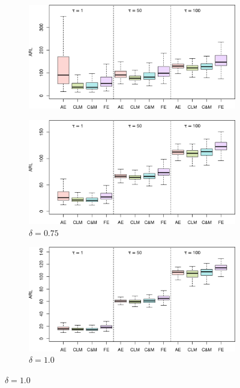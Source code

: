 \begin{figure}
\begin{subfigure}{0.49\textwidth}
  \label{fig:lambda=0.05/theta=4.0/delta=0.5}
  \includegraphics[width=\textwidth]{img/sims/theta=4.0_signedEWMA(l = 0.05, upw = true, L = 1.0)/delta=0.50.png}
\end{subfigure}
\begin{subfigure}{0.49\textwidth}
  \centering
  \caption{$ \delta = 0.75$}
  \label{fig:lambda=0.05/theta=4.0/delta=0.75}
  \includegraphics[width=\textwidth]{img/sims/theta=4.0_signedEWMA(l = 0.05, upw = true, L = 1.0)/delta=0.75.png}
\end{subfigure}
\begin{subfigure}{0.49\textwidth}
  \centering
  \caption{$ \delta = 1.0$}
  \label{fig:lambda=0.05/theta=4.0/delta=1.0}
  \includegraphics[width=\textwidth]{img/sims/theta=4.0_signedEWMA(l = 0.05, upw = true, L = 1.0)/delta=1.00.png}

\end{subfigure}
\end{figure}
